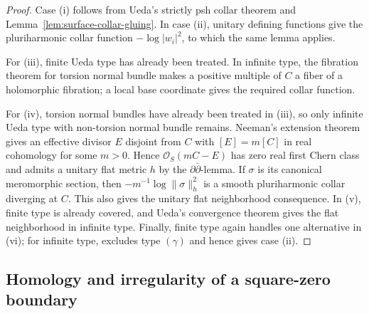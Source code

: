\documentclass[11pt]{amsart}
\theoremstyle{definition}
\theoremstyle{remark}
\numberwithin{equation}{section}
\newcommand{\OO}{\mathcal O}
\begin{document}
\begin{proof}
Case \textup{(i)} follows from Ueda's strictly psh collar theorem
\cite[Theorem~2.5]{CLPT2018} and
Lemma~\ref{lem:surface-collar-gluing}.  In case \textup{(ii)},
unitary defining functions give the pluriharmonic collar function
$-\log|w_i|^2$, to which the same lemma applies.

For \textup{(iii)}, finite Ueda type has already been treated.  In
infinite type, the fibration theorem for torsion normal bundle
\cite[Theorem~1.3]{CLPT2018} makes a positive multiple of $C$ a
fiber of a holomorphic fibration; a local base coordinate gives the
required collar function.

For \textup{(iv)}, torsion normal bundles have already been treated
in \textup{(iii)}, so only infinite Ueda type with non-torsion normal
bundle remains.  Neeman's
extension theorem \cite[Theorem~4.4]{CLPT2018} gives an effective
divisor $E$ disjoint from $C$ with $[E]=m[C]$ in real cohomology for
some $m>0$. Hence $\OO_S(mC-E)$ has zero real first Chern class and
admits a unitary flat metric $h$ by the $\partial\bar\partial$-lemma.
If $\sigma$ is its canonical meromorphic section, then
$-m^{-1}\log\|\sigma\|_h^2$ is a smooth pluriharmonic collar diverging
at $C$. This also gives the unitary flat neighborhood consequence.  In \textup{(v)}, finite
type is already covered, and Ueda's convergence theorem
\cite[Theorem~3]{Ueda1983} gives the flat neighborhood in infinite type.
Finally, finite type again handles one alternative in \textup{(vi)};
for infinite type,
\cite[Theorem~1.6]{CFSTZ2026} excludes type $(\gamma)$ and hence
gives case \textup{(ii)}.
\end{proof}


\subsection{Homology and irregularity of a square-zero boundary}
\end{document}
